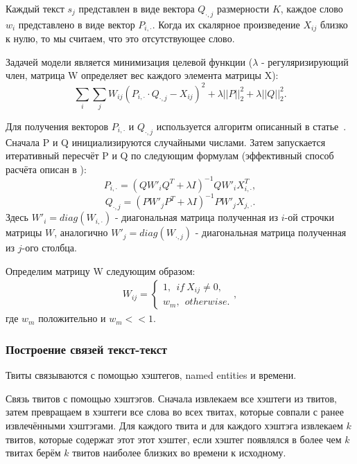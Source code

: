 \documentclass[14pt,a4paper,oneside]{extarticle}
\begin{document}
            Каждый текст $s_j$ представлен в виде вектора $Q_{\cdot,j}$ размерности $K$, каждое слово $w_i$ представлено в виде вектор $P_{i,\cdot}$. Когда их скалярное произведение $X_{ij}$ близко к нулю, то мы считаем, что это отсутствующее слово.

            Задачей модели является минимизация целевой функции ({\color{red}$\lambda$ - регуляризирующий член}, матрица W определяет вес каждого элемента матрицы X):
            $$\sum_i \sum_j W_{ij} (P_{i,\cdot} \cdot Q_{\cdot,j} - X_{ij})^2 + \lambda ||P||^2_2 + \lambda ||Q||^2_2.$$

            Для получения векторов $P_{i,\cdot}$ и $Q_{\cdot,j}$ используется алгоритм описанный в статье~\cite{matrix_approximation}. Сначала P и Q инициализируются случайными числами. Затем запускается итеративный пересчёт P и Q по следующим формулам (эффективный способ расчёта описан в \cite{steck_recommender}):
            $$P_{i, \cdot} = (Q W'_i Q^T + \lambda I)^{-1} Q W'_i X_{i,\cdot}^T,$$
            $$Q_{\cdot, j} = (P W'_j P^T + \lambda I)^{-1} P W'_j X_{j,\cdot}.$$
            Здесь $W'_i = diag(W_{i, \cdot})$ - диагональная матрица полученная из $i$-ой строчки матрицы $W$, аналогично $W'_j = diag(W_{\cdot, j})$ - диагональная матрица полученная из $j$-ого столбца.

            Определим матрицу W следующим образом:
            \begin{gather}
                W_{ij} = 
                \begin{cases}
                    1, ~~if~X_{ij} \neq 0, \nonumber \\
                    w_m, ~~otherwise. 
                \end{cases},
            \end{gather}
            где $w_m$ положительно и $w_m << 1$.

        \subsubsection{Построение связей текст-текст}
            Твиты связываются с помощью хэштегов, named entities и времени.

            Связь твитов с помощью хэштэгов. Сначала извлекаем все хэштеги из твитов, затем превращаем в хэштеги все слова во всех твитах, которые совпали с ранее извлечёнными хэштэгами. Для каждого твита и для каждого хэштэга извлекаем $k$ твитов, которые содержат этот этот хэштег, если хэштег появлялся в более чем $k$ твитах берём $k$ твитов наиболее близких во времени к исходному.
\end{document}

